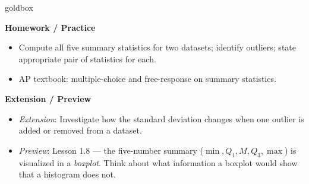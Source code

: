 \documentclass[10pt]{article}
\begin{document}
\begin{skillbox}{goldbox}
\begin{minipage}[t]{0.48\linewidth}
    \textbf{Homework / Practice}
    \begin{itemize}
        \item Compute all five summary statistics for two datasets; identify outliers; state appropriate pair of statistics for each.
        \item AP textbook: multiple-choice and free-response on summary statistics.
    \end{itemize}
\end{minipage}
\hfill
\begin{minipage}[t]{0.48\linewidth}
    \textbf{Extension / Preview}
    \begin{itemize}
        \item \textit{Extension}: Investigate how the standard deviation changes when one outlier is added or removed from a dataset.
        \item \textit{Preview}: Lesson 1.8 --- the five-number summary ($\min, Q_1, M, Q_3, \max$) is visualized in a \textit{boxplot}. Think about what information a boxplot would show that a histogram does not.
    \end{itemize}
\end{minipage}
\end{skillbox}
\end{document}
